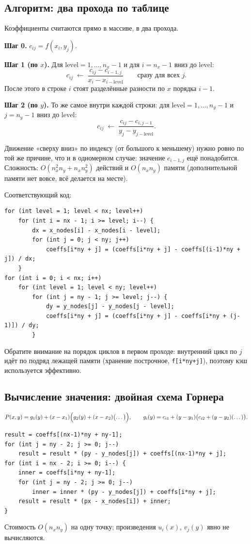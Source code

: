 \documentclass[11pt,a4paper]{report}
\begin{document}
\subsection{Алгоритм: два прохода по таблице}

Коэффициенты считаются прямо в массиве, в два прохода.

\textbf{Шаг 0.} $c_{ij}=f(x_i,y_j)$.

\textbf{Шаг 1 (по $x$).} Для $\text{level}=1,\dots,n_x-1$ и для
$i=n_x-1$ вниз до $\text{level}$:
\[
c_{ij}\;\leftarrow\;\frac{c_{ij}-c_{i-1,j}}{x_i-x_{i-\text{level}}}
\qquad\text{сразу для всех } j .
\]
После этого в строке $i$ стоят разделённые разности по $x$ порядка $i-1$.

\textbf{Шаг 2 (по $y$).} То же самое внутри каждой строки:
для $\text{level}=1,\dots,n_y-1$ и $j=n_y-1$ вниз до $\text{level}$:
\[
c_{ij}\;\leftarrow\;\frac{c_{ij}-c_{i,j-1}}{y_j-y_{j-\text{level}}} .
\]

Движение «сверху вниз» по индексу (от большого к меньшему) нужно ровно по той
же причине, что и в одномерном случае: значение $c_{i-1,j}$ ещё понадобится.
Сложность: $O(n_x^2n_y+n_xn_y^2)$ действий и $O(n_xn_y)$ памяти
(дополнительной памяти нет вовсе, всё делается на месте).

Соответствующий код:
\begin{lstlisting}[style=cpp]
for (int level = 1; level < nx; level++)
    for (int i = nx - 1; i >= level; i--) {
        dx = x_nodes[i] - x_nodes[i - level];
        for (int j = 0; j < ny; j++)
            coeffs[i*ny + j] = (coeffs[i*ny + j] - coeffs[(i-1)*ny + j]) / dx;
    }
for (int i = 0; i < nx; i++)
    for (int level = 1; level < ny; level++)
        for (int j = ny - 1; j >= level; j--) {
            dy = y_nodes[j] - y_nodes[j - level];
            coeffs[i*ny + j] = (coeffs[i*ny + j] - coeffs[i*ny + (j-1)]) / dy;
        }
\end{lstlisting}
Обратите внимание на порядок циклов в первом проходе: внутренний цикл по $j$
идёт по подряд лежащей памяти (хранение построчное,
\texttt{f[i*ny+j]}), поэтому кэш используется эффективно.

\subsection{Вычисление значения: двойная схема Горнера}

\[
P(x,y)=g_1(y)+(x-x_1)\Bigl(g_2(y)+(x-x_2)\bigl(\dots\bigr)\Bigr),\qquad
g_i(y)=c_{i1}+(y-y_1)\bigl(c_{i2}+(y-y_2)(\dots)\bigr).
\]
\begin{lstlisting}[style=cpp]
result = coeffs[(nx-1)*ny + ny-1];
for (int j = ny - 2; j >= 0; j--)
    result = result * (py - y_nodes[j]) + coeffs[(nx-1)*ny + j];
for (int i = nx - 2; i >= 0; i--) {
    inner = coeffs[i*ny + ny-1];
    for (int j = ny - 2; j >= 0; j--)
        inner = inner * (py - y_nodes[j]) + coeffs[i*ny + j];
    result = result * (px - x_nodes[i]) + inner;
}
\end{lstlisting}
Стоимость $O(n_xn_y)$ на одну точку; произведения $u_i(x)$, $v_j(y)$ явно
не вычисляются.
\end{document}
